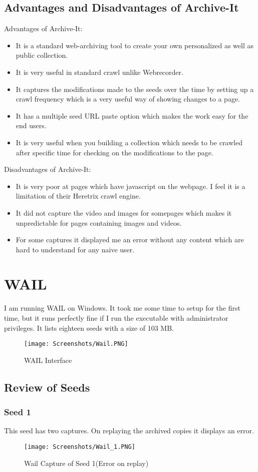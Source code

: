 \documentclass[11pt,journal,compsoc,onecolumn]{IEEEtran}
\begin{document}
\subsection{Advantages and Disadvantages of Archive-It}
Advantages of Archive-It:
\begin{itemize}
\item It is a standard web-archiving tool to create your own personalized as well as public collection.
\item It is very useful in standard crawl unlike Webrecorder. 
\item It captures the modifications made to the seeds over the time by setting up a crawl frequency which is a very useful way of showing changes to a page.
\item It has a multiple seed URL paste option which makes the work easy for the end users.
\item It is very useful when you building a collection which needs to be crawled after specific time for checking on the modifications to the page.
\end{itemize}
Disadvantages of Archive-It:
\begin{itemize}
\item It is very poor at pages which have javascript on the webpage. I feel it is a limitation of their Heretrix crawl engine.
\item It did not capture the video and images for somepages which makes it unpredictable for pages containing images and videos.
\item For some captures it displayed me an error without any content which are hard to understand for any naive user.
\end{itemize}
\section{WAIL}
I am running WAIL on Windows. It took me some time to setup for the first time, but it runs perfectly fine if I run the executable with administrator privileges. It lists eighteen seeds with a size of 103 MB.
 \begin{figure}[ht] 
  \centering
  \texttt{[image: Screenshots/Wail.PNG]}
  \caption{WAIL Interface}
  \label{fig:39}
\end{figure}
\subsection{Review of  Seeds}
\subsubsection{Seed 1}
This seed has two captures. On replaying the archived copies it displays an error.
 \begin{figure}[ht] 
  \centering
  \texttt{[image: Screenshots/Wail\_1.PNG]}
  \caption{Wail Capture of Seed 1(Error on replay)}
  \label{fig:40}
\end{figure}
\end{document}

